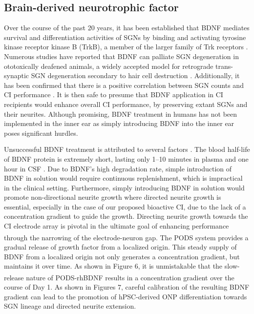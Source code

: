 \documentclass[review]{elsarticle}
\begin{document}
\subsection {Brain-derived neurotrophic factor} 
Over the course of the past 20 years, it has been established that BDNF mediates survival and differentiation activities of SGNs by binding and activating tyrosine kinase receptor kinase B (TrkB), a member of the larger family of Trk receptors \cite{green2012}. Numerous studies have reported that BDNF can palliate SGN degeneration in ototoxically deafened animals, a widely accepted model for retrograde trans-synaptic SGN degeneration secondary to hair cell destruction \cite{Gillespie2003,Pettingill2008,Yamagata2004,Zanin2014}. Additionally, it has been confirmed that there is a positive correlation between SGN counts and CI performance \cite{Seyyedi2014}. It is then safe to presume that BDNF application in CI recipients would enhance overall CI performance, by preserving extant SGNs and their neurites.  Although promising, BDNF treatment in humans has not been implemented in the inner ear as simply introducing BDNF into the inner ear poses significant hurdles. 

\indent Unsuccessful BDNF treatment is attributed to several factors \cite{Henriques2010}. The blood half-life of BDNF protein is extremely short, lasting only 1–10 minutes in plasma \cite{Poduslo1996,Sakane1997} and one hour in CSF \cite{Soderquist2009}. Due to BDNF's high degradation rate, simple introduction of BDNF in solution would require continuous replenishment, which is impractical in the clinical setting. Furthermore, simply introducing BDNF in solution would promote non-directional neurite growth where directed neurite growth is essential, especially in the case of our proposed bioactive CI, due to the lack of a concentration gradient to guide the growth. Directing neurite growth towards the CI electrode array is pivotal in the ultimate goal of enhancing performance through the narrowing of the electrode-neuron gap. The PODS\textsuperscript{\textregistered} system provides a gradual release of growth factor from a localized origin. This steady supply of BDNF from a localized origin not only generates a concentration gradient, but maintains it over time. As shown in Figure 6, it is unmistakable that the slow-release nature of PODS\textsuperscript{\textregistered}-rhBDNF results in a concentration gradient over the course of Day 1. As shown in Figures 7, careful calibration of the resulting BDNF gradient can lead to the promotion of hPSC-derived ONP differentiation towards SGN lineage and directed neurite extension. 
\end{document}
